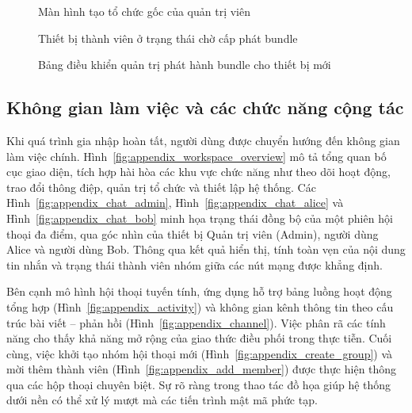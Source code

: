 \documentclass[../DoAn.tex]{subfiles}
\begin{document}
\begin{figure}[htbp]
\centering
{}
\caption{Màn hình tạo tổ chức gốc của quản trị viên}
\label{fig:appendix_admin_setup}
\end{figure}

\begin{figure}[htbp]
\centering
{}
\caption{Thiết bị thành viên ở trạng thái chờ cấp phát bundle}
\label{fig:appendix_awaiting_bundle}
\end{figure}

\begin{figure}[htbp]
\centering
{}
\caption{Bảng điều khiển quản trị phát hành bundle cho thiết bị mới}
\label{fig:appendix_issue_bundle}
\end{figure}

\clearpage
\subsection{Không gian làm việc và các chức năng cộng tác}

Khi quá trình gia nhập hoàn tất, người dùng được chuyển hướng đến không gian làm việc chính. Hình~\ref{fig:appendix_workspace_overview} mô tả tổng quan bố cục giao diện, tích hợp hài hòa các khu vực chức năng như theo dõi hoạt động, trao đổi thông điệp, quản trị tổ chức và thiết lập hệ thống. Các Hình~\ref{fig:appendix_chat_admin}, Hình~\ref{fig:appendix_chat_alice} và Hình~\ref{fig:appendix_chat_bob} minh họa trạng thái đồng bộ của một phiên hội thoại đa điểm, qua góc nhìn của thiết bị Quản trị viên (Admin), người dùng Alice và người dùng Bob. Thông qua kết quả hiển thị, tính toàn vẹn của nội dung tin nhắn và trạng thái thành viên nhóm giữa các nút mạng được khẳng định.

Bên cạnh mô hình hội thoại tuyến tính, ứng dụng hỗ trợ bảng luồng hoạt động tổng hợp (Hình~\ref{fig:appendix_activity}) và không gian kênh thông tin theo cấu trúc bài viết -- phản hồi (Hình~\ref{fig:appendix_channel}). Việc phân rã các tính năng cho thấy khả năng mở rộng của giao thức điều phối trong thực tiễn. Cuối cùng, việc khởi tạo nhóm hội thoại mới (Hình~\ref{fig:appendix_create_group}) và mời thêm thành viên (Hình~\ref{fig:appendix_add_member}) được thực hiện thông qua các hộp thoại chuyên biệt. Sự rõ ràng trong thao tác đồ họa giúp hệ thống dưới nền có thể xử lý mượt mà các tiến trình mật mã phức tạp.
\end{document}
